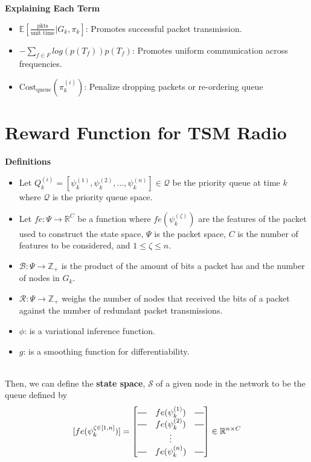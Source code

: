 \documentclass{article}
\newcommand*{\horzbar}{\rule[.5ex]{2.5ex}{0.5pt}}
\begin{document}
\textbf{Explaining Each Term}
\begin{itemize}
    \item $\mathbb{E}[\frac{\text{pkts}}{\text{unit time}} | G_{k}, \pi_{k}]$: Promotes successful packet transmission.
    \item $-\sum_{f \in F} log(p(T_{f})) p(T_{f})$: Promotes uniform communication across frequencies.
    \item $\text{Cost}_{\text{queue}}(\pi_{k}^{(i)})$: Penalize dropping packets or re-ordering queue
\end{itemize}


\newpage

\section{Reward Function for TSM Radio}

\vspace{1 cm}

\noindent \textbf{Definitions}

\begin{itemize}
    \item Let $Q_{k}^{(i)} = [\psi_{k}^{(1)}, \psi_{k}^{(2)}, \dots, \psi_{k}^{(n)}] \in \mathcal{Q}$ be the priority queue at time $k$ where $\mathcal{Q}$ is the priority queue space.
    \item Let $fe: \Psi \to \mathbb{R}^{C}$ be a function where $fe(\psi_{k}^{(\zeta)})$ are the features of the packet used to construct the state space, $\Psi$ is the packet space, $C$ is the number of features to be considered, and $1 \le \zeta \le n$.
    \item $\mathcal{B}: \Psi \to \mathbb{Z}_{+}$ is the product of the amount of bits a packet has and the number of nodes in $G_{k}$.
    \item $\mathcal{R}: \Psi \to \mathbb{Z}_{+}$ weighs the number of nodes that received the bits of a packet against the number of redundant packet transmissions.
    \item $\phi$: is a variational inference function.
    \item $g$: is a smoothing function for differentiability.



\end{itemize}\\

Then, we can define the \textbf{state space}, $\mathcal{S}$ of a given node in the network to be the queue defined by 
$$
[fe(\psi_{k}^{\zeta \in [1, n]})] =
\begin{bmatrix}
    \horzbar & fe(\psi_{k}^{(1)}) & \horzbar \\
    \horzbar & fe(\psi_{k}^{(2)}) & \horzbar \\
    & \vdots    & \\
    \horzbar & fe(\psi_{k}^{(n)}) & \horzbar \\
\end{bmatrix} 
\in \mathbb{R}^{n \times C}
$$\\
\end{document}
